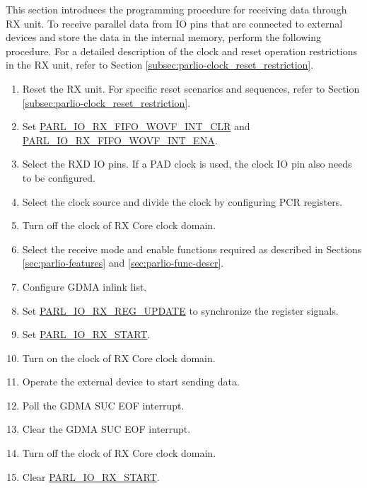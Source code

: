 \documentclass[main\_\_EN.tex]{subfiles}
\begin{document}
This section introduces the programming procedure for receiving data through RX unit. To receive parallel data from IO pins that are connected to external devices and store the data in the internal memory, perform the following procedure. For a detailed description of the clock and reset operation restrictions in the RX unit, refer to Section \ref{subsec:parlio-clock_reset_restriction}.
\begin{enumerate}
    \item Reset the RX unit. For specific reset scenarios and sequences, refer to Section \ref{subsec:parlio-clock_reset_restriction}.
    \item Set \hyperref[fielddesc:PARLIORXFIFOWOVFINTCLR]{PARL\_IO\_RX\_FIFO\_WOVF\_INT\_CLR} and \hyperref[fielddesc:PARLIORXFIFOWOVFINTENA]{PARL\_IO\_RX\_FIFO\_WOVF\_INT\_ENA}.
    \item Select the RXD IO pins. If a PAD clock is used, the clock IO pin also needs to be configured. 
    \item Select the clock source and divide the clock by configuring PCR registers.
    \item Turn off the clock of RX Core clock domain.
    \item Select the receive mode and enable functions required as described in Sections \ref{sec:parlio-features} and \ref{sec:parlio-func-descr}.
    \item Configure GDMA inlink list.
    \item Set \hyperref[fielddesc:PARLIORXREGUPDATE]{PARL\_IO\_RX\_REG\_UPDATE} to synchronize the register signals.
    \item Set \hyperref[fielddesc:PARLIORXSTART]{PARL\_IO\_RX\_START}.
    \item Turn on the clock of RX Core clock domain.
    \item Operate the external device to start sending data.
    \item Poll the GDMA SUC EOF interrupt.
    \item Clear the GDMA SUC EOF interrupt.
    \item Turn off the clock of RX Core clock domain.
    \item Clear \hyperref[fielddesc:PARLIORXSTART]{PARL\_IO\_RX\_START}.
\end{enumerate}
\end{document}
